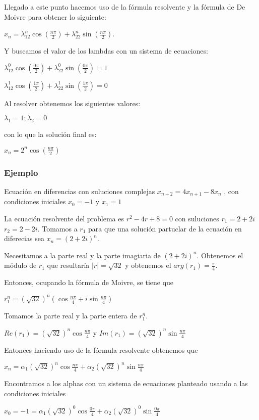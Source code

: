 \documentclass{article}
\begin{document}
Llegado a este punto hacemos uso de la fórmula resolvente y la fórmula de De Moivre para obtener lo siguiente:

$x_n=\lambda_12^n\cos(\frac{n\pi}{2})+\lambda_22^n\sin(\frac{n\pi}{2})$.

Y buscamos el valor de los lambdas con un sistema de ecuaciones:

$\lambda_12^0\cos(\frac{0\pi}{2})+\lambda_22^0\sin(\frac{0\pi}{2})=1$

$\lambda_12^1\cos(\frac{1\pi}{2})+\lambda_22^1\sin(\frac{1\pi}{2})=0$

Al resolver obtenemos los siguientes valores:

$\lambda_1=1;\lambda_2=0$

con lo que la solución final es:

$x_n=2^n\cos(\frac{n\pi}{2})$
\bigskip

\subsubsection{Ejemplo}

Ecuación en diferencias con suluciones complejas
$x_{n+2}=4x_{n+1}-8x_{n}$ , con condiciones iniciales $x_{0}=-1$ y $x_{1}=1$

La ecuación resolvente del problema es $r^2-4r+8=0$ con suluciones $r_{1}=2+2i$ $r_{2}=2-2i$.
Tomamos a $r_{1}$ para que una solución partuclar de la ecuación en diferecias sea $x_{n}=(2+2i)^n$.

Necesitamos a la parte real y la parte imagiaria de $(2+2i)^n$. Obtenemos el módulo de $r_{1}$ que resultaría $|r|= \sqrt{32}$ y obtenemos el $arg(r_{1})=\frac{\pi}{4}$.

Entonces, ocupando la fórmula de Moivre, se tiene que

$r_{1}^n=(\sqrt{32})^n(\cos{\frac{n\pi}{4}}+i\sin{\frac{n\pi}{4}})$

Tomamos la parte real y la parte entera de $r_{1}^n$.

$Re(r_{1})=(\sqrt{32})^n\cos{\frac{n\pi}{4}}$ y $Im(r_{1})=(\sqrt{32})^n\sin{\frac{n\pi}{4}}$

  Entonces haciendo uso de la fórmula resolvente obtenemos que

  $x_{n}=\alpha_{1}(\sqrt{32})^n\cos{\frac{n\pi}{4}} + \alpha_{2}(\sqrt{32})^n\sin{\frac{n\pi}{4}}$

    Encontramos a los alphas con un sistema de ecuaciones planteado usando a las condiciones iniciales

    $x_{0}=-1=\alpha_{1}(\sqrt{32})^0\cos{\frac{0\pi}{4}} + \alpha_{2}(\sqrt{32})^0\sin{\frac{0\pi}{4}}$
      
\end{document}

